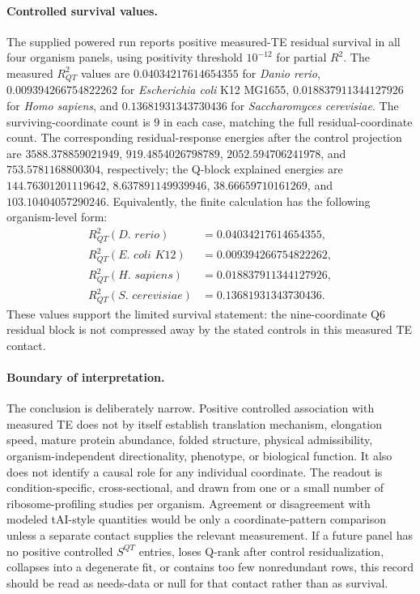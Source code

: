 \paragraph{Controlled survival values.}
The supplied powered run reports positive measured-TE residual survival in all four organism panels, using positivity threshold $10^{-12}$ for partial $R^2$.  The measured $R^2_{QT}$ values are $0.04034217614654355$ for \emph{Danio rerio}, $0.009394266754822262$ for \emph{Escherichia coli} K12 MG1655, $0.018837911344127926$ for \emph{Homo sapiens}, and $0.13681931343730436$ for \emph{Saccharomyces cerevisiae}.  The surviving-coordinate count is $9$ in each case, matching the full residual-coordinate count.  The corresponding residual-response energies after the control projection are $3588.378859021949$, $919.4854026798789$, $2052.594706241978$, and $753.5781168800304$, respectively; the Q-block explained energies are $144.76301201119642$, $8.637891149939946$, $38.66659710161269$, and $103.10404057290246$.  Equivalently, the finite calculation has the following organism-level form:
$$
\begin{aligned}
R^2_{QT}(\textit{D. rerio}) &= 0.04034217614654355,\\
R^2_{QT}(\textit{E. coli K12}) &= 0.009394266754822262,\\
R^2_{QT}(\textit{H. sapiens}) &= 0.018837911344127926,\\
R^2_{QT}(\textit{S. cerevisiae}) &= 0.13681931343730436.
\end{aligned}
$$
These values support the limited survival statement: the nine-coordinate Q6 residual block is not compressed away by the stated controls in this measured TE contact.

\paragraph{Boundary of interpretation.}
The conclusion is deliberately narrow.  Positive controlled association with measured TE does not by itself establish translation mechanism, elongation speed, mature protein abundance, folded structure, physical admissibility, organism-independent directionality, phenotype, or biological function.  It also does not identify a causal role for any individual coordinate.  The readout is condition-specific, cross-sectional, and drawn from one or a small number of ribosome-profiling studies per organism.  Agreement or disagreement with modeled tAI-style quantities would be only a coordinate-pattern comparison unless a separate contact supplies the relevant measurement.  If a future panel has no positive controlled $S^{QT}$ entries, loses Q-rank after control residualization, collapses into a degenerate fit, or contains too few nonredundant rows, this record should be read as needs-data or null for that contact rather than as survival.

